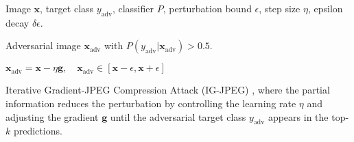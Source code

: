 Image $\mathbf{x}$, target class $y_{\text{adv}}$, classifier $P$, perturbation bound $\epsilon$, step size $\eta$, epsilon decay $\delta \epsilon$.

Adversarial image $\mathbf{x}_{\text{adv}}$ with $P(y_{\text{adv}}|\mathbf{x}_{\text{adv}}) > 0.5$.

$\mathbf{x}_{\text{adv}} = \mathbf{x} - \eta \mathbf{g}, \quad \mathbf{x}_{\text{adv}} \in [\mathbf{x} - \epsilon, \mathbf{x} + \epsilon]$

Iterative Gradient-JPEG Compression Attack (IG-JPEG) , where the partial information reduces the perturbation by controlling the learning rate $\eta$ and adjusting the gradient $\mathbf{g}$ until the adversarial target class $y_{\text{adv}}$ appears in the top-$k$ predictions.
